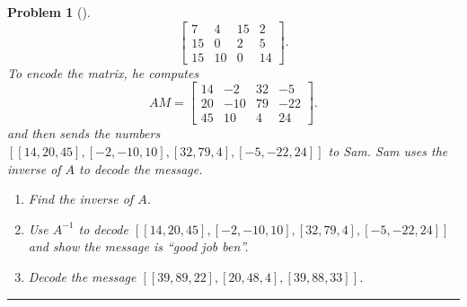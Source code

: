 \documentclass[letterpaper,oneside]{book}%
\theoremstyle{plain}
\theoremstyle{box}
\theoremstyle{problem}
\newtheorem{problemnum}{Problem}[chapter]
\newenvironment{problem}[1][]{\begin{problemnum}[#1]}{\end{problemnum}\nopagebreak\hrule\bigskip}
\begin{document}
\begin{problem}
$$\begin{bmatrix}
7 & 4 & 15 & 2 \\
15 & 0 & 2 & 5 \\
15 & 10 & 0 & 14  
\end{bmatrix}
.$$
To encode the matrix, he computes 
$$AM = 
\begin{bmatrix}
14 & -2 & 32 & -5 \\
20 & -10 & 79 & -22 \\
45 & 10 & 4 & 24
\end{bmatrix}.$$
and then sends the numbers 
$[
[ 14,  20,  45],
[ -2, -10,  10],
[ 32,  79,   4],
[ -5, -22,  24]]
$ to Sam. Sam uses the inverse of $A$ to decode the message. 
\begin{enumerate}
 \item Find the inverse of $A$. 
 \item Use $A^{-1}$ to decode $[
[ 14,  20,  45],
[ -2, -10,  10],
[ 32,  79,   4],
[ -5, -22,  24]]$ and show the message is ``good job ben''.
 \item Decode the message $[[39, 89, 22],[20, 48,  4],[39, 88, 33]]$.
\end{enumerate}


\end{problem}
\end{document}
